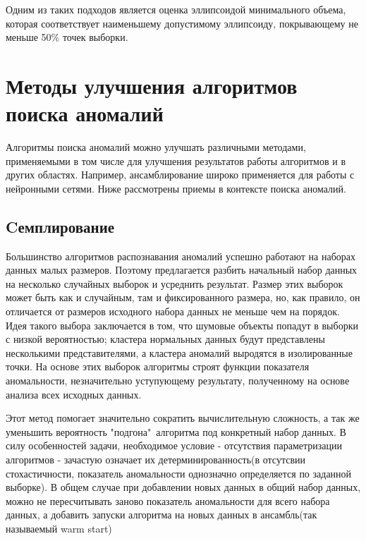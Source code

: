 Одним из таких подходов является оценка эллипсоидой минимального объема\cite{Book11}, которая соответствует наименьшему допустимому эллипсоиду, покрывающему не меньше 50\% точек выборки.



\section{Методы улучшения алгоритмов поиска аномалий}
Алгоритмы поиска аномалий можно улучшать различными методами, применяемыми в том числе для  улучшения результатов работы алгоритмов и в других областях. Например, ансамблирование широко применяется для работы с нейронными сетями. Ниже рассмотрены приемы в контексте поиска аномалий.
\subsection{Cемплирование}
Большинство алгоритмов распознавания аномалий успешно работают на наборах данных малых размеров. Поэтому предлагается разбить начальный набор данных на несколько случайных выборок и усреднить результат. Размер этих выборок может быть как и случайным, там и фиксированного размера, но, как правило, он отличается от размеров исходного набора данных не меньше чем на порядок. Идея такого выбора заключается в том, что шумовые объекты попадут в выборки с низкой вероятностью; кластера нормальных данных будут представлены несколькими представителями, а кластера аномалий выродятся в изолированные точки. На основе этих выборок алгоритмы строят функции показателя аномальности, незначительно уступующему результату, полученному на основе анализа всех исходных данных. 

Этот метод помогает значительно сократить вычислительную сложность, а так же уменьшить вероятность "подгона"\ алгоритма под конкретный набор данных.  В силу особенностей задачи, необходимое условие - отсутствия параметризации алгоритмов -  зачастую означает их детерминированность(в отсутсвии стохастичности, показатель аномальности однозначно определяется по  заданной выборке). В общем случае при добавлении новых данных в общий набор данных, можно не пересчитывать заново показатель аномальности для всего набора данных, а добавить запуски алгоритма на новых данных в ансамбль(так называемый warm start\cite{Book15})

